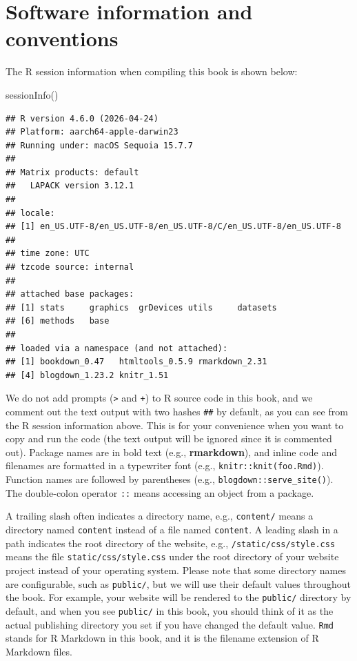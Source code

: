 \documentclass[
  12pt,
]{krantz}
\makeatletter
\newenvironment{Shaded}{\begin{snugshade}}{\end{snugshade}}
\newcommand{\FunctionTok}[1]{\textcolor[rgb]{0.00,0.00,0.00}{#1}}
\newcommand{\NormalTok}[1]{#1}
\newenvironment{kframe}{%
\medskip{}
\setlength{\fboxsep}{.8em}
 \def\at@end@of@kframe{}%
 \ifinner\ifhmode%
  \def\at@end@of@kframe{\end{minipage}}%
  \begin{minipage}{\columnwidth}%
 \fi\fi%
 \def\FrameCommand##1{\hskip\@totalleftmargin \hskip-\fboxsep
 \colorbox{shadecolor}{##1}\hskip-\fboxsep
     \hskip-\linewidth \hskip-\@totalleftmargin \hskip\columnwidth}%
 \MakeFramed {\advance\hsize-\width
   \@totalleftmargin\z@ \linewidth\hsize
   \@setminipage}}%
 {\par\unskip\endMakeFramed%
 \at@end@of@kframe}
\renewenvironment{Shaded}{\begin{kframe}}{\end{kframe}}
\makeatother
\begin{document}
\hypertarget{software-info}{%
\section*{Software information and conventions}\label{software-info}}


The R session information when compiling this book is shown below:

\begin{Shaded}
\begin{Highlighting}[]
\FunctionTok{sessionInfo}\NormalTok{()}
\end{Highlighting}
\end{Shaded}

\begin{verbatim}
## R version 4.6.0 (2026-04-24)
## Platform: aarch64-apple-darwin23
## Running under: macOS Sequoia 15.7.7
## 
## Matrix products: default
##   LAPACK version 3.12.1
## 
## locale:
## [1] en_US.UTF-8/en_US.UTF-8/en_US.UTF-8/C/en_US.UTF-8/en_US.UTF-8
## 
## time zone: UTC
## tzcode source: internal
## 
## attached base packages:
## [1] stats     graphics  grDevices utils     datasets 
## [6] methods   base     
## 
## loaded via a namespace (and not attached):
## [1] bookdown_0.47   htmltools_0.5.9 rmarkdown_2.31 
## [4] blogdown_1.23.2 knitr_1.51
\end{verbatim}

We do not add prompts (\texttt{\textgreater{}} and \texttt{+}) to R source code in this book, and we comment out the text output with two hashes \texttt{\#\#} by default, as you can see from the R session information above. This is for your convenience when you want to copy and run the code (the text output will be ignored since it is commented out). Package names are in bold text (e.g., \textbf{rmarkdown}), and inline code and filenames are formatted in a typewriter font (e.g., \texttt{knitr::knit(\textquotesingle{}foo.Rmd\textquotesingle{})}). Function names are followed by parentheses (e.g., \texttt{blogdown::serve\_site()}). The double-colon operator \texttt{::} means accessing an object from a package.

A trailing slash often indicates a directory name, e.g., \texttt{content/} means a directory named \texttt{content} instead of a file named \texttt{content}. A leading slash in a path indicates the root directory of the website, e.g., \texttt{/static/css/style.css} means the file \texttt{static/css/style.css} under the root directory of your website project instead of your operating system. Please note that some directory names are configurable, such as \texttt{public/}, but we will use their default values throughout the book. For example, your website will be rendered to the \texttt{public/} directory by default, and when you see \texttt{public/} in this book, you should think of it as the actual publishing directory you set if you have changed the default value. \texttt{Rmd} stands for R Markdown in this book, and it is the filename extension of R Markdown files.
\end{document}
